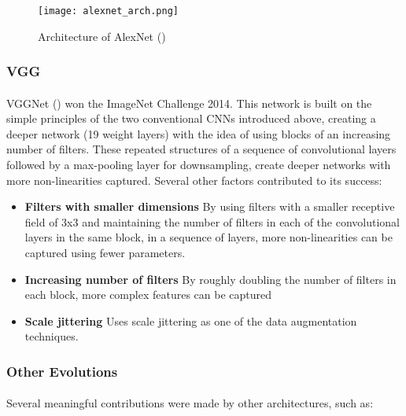     \begin{figure}[hbt!]
        \centering
        \texttt{[image: alexnet\_arch.png]}
        \caption{Architecture of AlexNet (\cite{10.5555/2999134.2999257})}
        \label{fig_alexnet}
    \end{figure}


\subsubsection{VGG}
\paragraph{}
VGGNet (\cite{simonyan2014deep}) won the ImageNet Challenge 2014. This network is built on the simple principles of the two conventional \gls{CNN}s introduced above, creating a deeper network (19 weight layers) with the idea of using blocks of an increasing number of filters. These repeated structures of a sequence of convolutional layers followed by a max-pooling layer for downsampling, create deeper networks with more non-linearities captured. Several other factors contributed to its success:

\begin{itemize}
    \item \textbf{Filters with smaller dimensions} By using filters with a smaller receptive field of 3x3 and maintaining the number of filters in each of the convolutional layers in the same block, in a sequence of layers, more non-linearities can be captured using fewer parameters.
 
    \item \textbf{Increasing number of filters} By roughly doubling the number of filters in each block, more complex features can be captured
    \item \textbf{Scale jittering} Uses scale jittering as one of the data augmentation techniques.

\end{itemize}


\subsubsection{Other Evolutions}
\paragraph{}
Several meaningful contributions were made by other architectures, such as:

